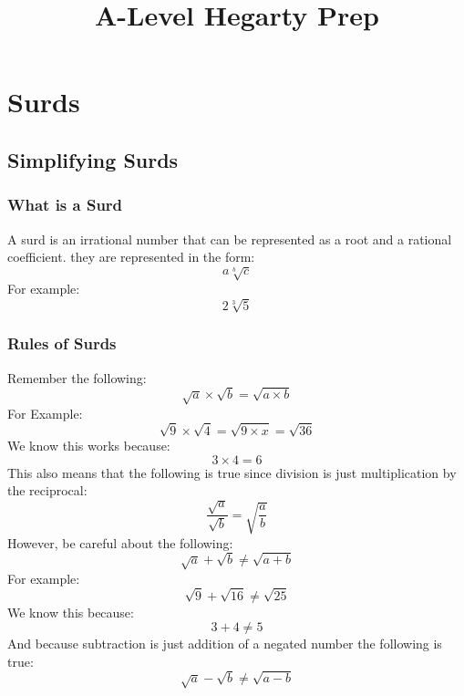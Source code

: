 \documentclass[a4paper]{article}
\begin{document}
\title{A-Level Hegarty Prep}
\maketitle

\section{Surds}

\subsection{Simplifying Surds}

\subsubsection{What is a Surd}
A surd is an irrational number that can be represented as a root and a rational coefficient.
they are represented in the form:
\begin{equation}
	a\sqrt[b]{c}
\end{equation}
For example:
\begin{equation}
	2\sqrt[3]{5}
\end{equation}

\subsubsection{Rules of Surds}
Remember the following:
\begin{equation}
	\sqrt{a} \times \sqrt{b} = \sqrt{a \times b}
\end{equation}
For Example:
\begin{equation}
	\sqrt{9} \times \sqrt{4} = \sqrt{9 \times x} = \sqrt{36}
\end{equation}
We know this works because:
\begin{equation}
	3 \times 4 = 6
\end{equation}
This also means that the following is true since division is just multiplication by the reciprocal:
\begin{equation}
	\frac{\sqrt{a}}{\sqrt{b}} = \sqrt{\frac{a}{b}}
\end{equation}
However, be careful about the following:
\begin{equation}
	\sqrt{a} + \sqrt{b} \ne \sqrt{a + b}
\end{equation}
For example:
\begin{equation}
	\sqrt{9} + \sqrt{16} \ne \sqrt{25}
\end{equation}
We know this because:
\begin{equation}
	3 + 4 \ne 5
\end{equation}
And because subtraction is just addition of a negated number the following is true:
\begin{equation}
	\sqrt{a} - \sqrt{b} \ne \sqrt{a - b}
\end{equation}
\end{document}
